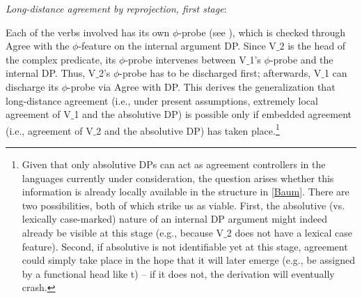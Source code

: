 \documentclass[output=paper
,modfonts
,nonflat]{langsci/langscibook}
\begin{document}
\ea\label{ex:mueller:32} {\itshape Long-distance agreement \label{Baum}by reprojection, first stage}:
\z

Each of the verbs involved has its own $\phi$-probe
(see \cite{Bejar&Rezac:09}), which is checked through Agree with the
$\phi$-feature on the internal argument DP. Since V$\_$2 is the head of
the complex predicate, its $\phi$-probe intervenes between V$\_$1's
$\phi$-probe and the internal DP.  Thus, V$\_$2's $\phi$-probe has to be
discharged first; afterwards, V$\_$1 can discharge its  $\phi$-probe via
Agree with DP. This
derives the generalization that long-distance agreement (i.e., under
present assumptions, extremely local agreement of V$\_$1 and the absolutive DP)
is possible only if embedded agreement (i.e., agreement of V$\_$2 and the
absolutive DP) has taken place.\footnote{Given that only absolutive
  DPs can act as agreement controllers in the languages currently
  under consideration, the question arises whether this information is
  already locally available in the structure in \ref{Baum}. There are
  two possibilities, both of which strike us as viable. First, the
  absolutive (vs. lexically case-marked) nature of an internal DP
  argument might indeed already be visible at this stage (e.g.,
  because V$\_$2 does not have a lexical case feature). Second, if
  absolutive is not identifiable yet at this stage, agreement could
  simply take place in the hope that it will later emerge (e.g., be
  assigned by a functional head like t) -- if it does not, the
  derivation will eventually crash.}
\end{document}
